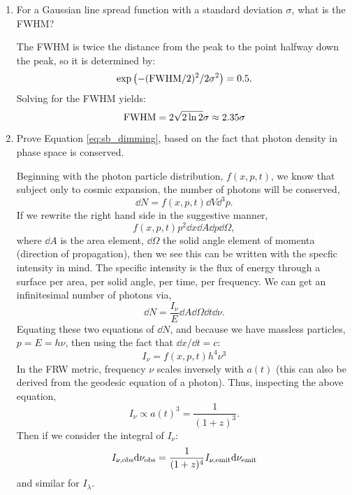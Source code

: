 \begin{enumerate}
\item For a Gaussian line spread function with a standard deviation
  $\sigma$, what is the FWHM?

\begin{answer}
The FWHM is twice the distance from the peak to the point halfway down
the peak, so it is determined by:
\begin{equation}
\exp\left(- ({\rm FWHM} / 2)^2 / 2 \sigma^2\right) = 0.5.
\end{equation}
Solving for the FWHM yields: 
\begin{equation}
{\rm FWHM} = 2 \sqrt{2\ln 2} \sigma \approx 2.35 \sigma
\end{equation}
\end{answer}
\item Prove Equation \ref{eq:sb_dimming}, based on the fact that
  photon density in phase space is conserved.

\begin{answer}
Beginning with the photon particle distribution, $f(x,p,t)$, we know
that subject only to cosmic expansion, the number of photons will be
conserved,
\begin{equation}
\dd N =f(x,p,t)\dd V \dd^3 p.
\end{equation}
If we rewrite the right hand side in the suggestive manner,
\begin{equation}
f(x,p,t)p^2\dd x \dd A \dd p \dd \Omega,
\end{equation}
where $\dd A$ is the area element, $\dd \Omega$ the solid angle
element of momenta (direction of propagation), then we see this can be
written with the specfic intensity in mind. The specific intensity is
the flux of energy through a surface per area, per solid angle, per
time, per frequency. We can get an infinitesimal number of photons
via,
\begin{equation}
 \dd N =\frac{I_\nu}{E} \dd A \dd \Omega  \dd t \dd \nu.
\end{equation}
Equating these two equations of $\dd N$, and because we have massless
particles, $p=E=h\nu$, then using the fact that $\dd x / \dd t = c$:
\begin{equation}
    I_\nu=f(x,p,t)h^{4} \nu^3
\end{equation}
In the FRW metric, frequency $\nu$ scales inversely with $a(t)$ (this
can also be derived from the geodesic equation of a photon). Thus,
inspecting the above equation,
\begin{equation}
    I_\nu\propto a(t)^{3} = \frac{1}{(1+z)^3}.
\end{equation}
Then if we consider the integral of $I_\nu$:
\begin{equation}
    I_{\nu, \rm obs} {\rm d}\nu_{\rm obs}  =
    \frac{1}{(1+z)^4} I_{\nu, \rm emit} {\rm d}\nu_{\rm emit}
\end{equation}
and similar for $I_\lambda$.
\end{answer}


\end{enumerate}
